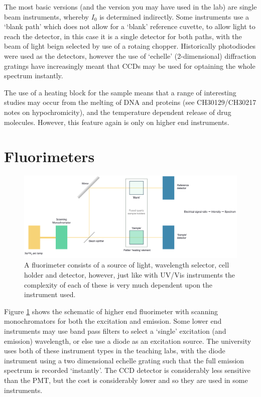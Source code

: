 \documentclass[
]{book}
\begin{document}
The most basic versions (and the version you may have used in the lab) are single beam instruments, whereby \(I_0\) is determined indirectly. Some instruments use a `blank path' which does not allow for a `blank' reference cuvette, to allow light to reach the detector, in this case it is a single detector for both paths, with the beam of light beign selected by use of a rotaing chopper. Historically photodiodes were used as the detectors, however the use of `echelle' (2-dimensional) diffraction gratings have increasingly meant that CCDs may be used for optaining the whole spectrum instantly.

The use of a heating block for the sample means that a range of interesting studies may occur from the melting of DNA and proteins (see CH30129/CH30217 notes on hypochromicity), and the temperature dependent release of drug molecules. However, this feature again is only on higher end instruments.

\hypertarget{sec:fluorimeter}{%
\section{Fluorimeters}\label{sec:fluorimeter}}

\begin{figure}

{\centering \includegraphics[width=1\linewidth]{images/UVvis} 

}

\caption{A fluorimeter consists of a source of light, wavelength selector, cell holder and detector, however, just like with UV/Vis instruments the complexity of each of these is very much dependent upon the instrument used.}\label{fig:fluorimeter}
\end{figure}

Figure \ref{fig:fluorimeter} shows the schematic of higher end fluorimeter with scanning monochromators for both the excitation and emission. Some lower end instruments may use band pass filters to select a `single' excitation (and emission) wavelength, or else use a diode as an excitation source. The university uses both of these instrument types in the teaching labs, with the diode instrument using a two dimensional echelle grating such that the full emission spectrum is recorded `instantly'. The CCD detector is considerably less sensitive than the PMT, but the cost is considerably lower and so they are used in some instruments.
\end{document}
